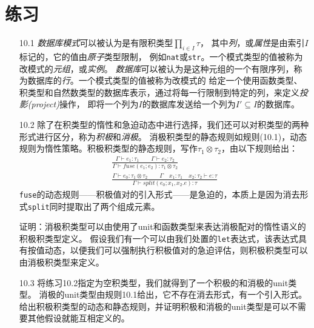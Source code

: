 \section*{练习}
\begin{itemize}
\item[10.1] \textit{数据库模式}可以被认为是有限积类型$\prod_{i\in I}\tau$，
其中\textit{列}，或\textit{属性}是由索引$I$标记的，它的值由\textit{原子}类型限制，
例如\texttt{nat}或\texttt{str}。一个模式类型的值被称为改模式的\textit{元组}，或\textit{实例}。
\textit{数据库}可以被认为是这种元组的一个有限序列，称为数据库的\textit{行}。一个模式类型的值被称为改模式的
给定一个使用函数类型、积类型和自然数类型的数据库表示，通过将每一行限制到特定的列，来定义\textit{投影(project)}操作，
即将一个列为$I$的数据库发送给一个列为$I'\subseteq I$的数据库。

\item[10.2] 除了在积类型的惰性和急迫动态中进行选择，我们还可以对积类型的两种形式进行区分，称为\textit{积极}和\textit{消极}。
消极积类型的静态规则如规则(10.1)，动态规则为惰性策略。积极积类型的静态规则，写作$\tau_1 \otimes \tau_2$，由以下规则给出：
\begin{subequations}
    \begin{gather}
    \frac{\Gamma \vdash e_1 : \tau_1 \qquad \Gamma \vdash e_2 : \tau_2}
    {\Gamma \vdash fuse(e_1;e_2):\tau_1 \otimes \tau_2} \\
    \frac{\Gamma \vdash e_0:\tau_1\otimes\tau_2\qquad\Gamma\quad x_1:\tau_1\quad x_2:\tau_2\vdash e:\tau}
    {\Gamma\vdash split(e_0;x_1,x_2 .e):\tau}
    \end{gather}
\end{subequations}
\texttt{fuse}的动态规则——积极值对的引入形式——是急迫的，本质上是因为消去形式\texttt{split}同时提取出了两个组成元素。

证明：消极积类型可以由使用了unit和函数类型来表达消极配对的惰性语义的积极积类型定义。
假设我们有一个可以由我们处置的\texttt{let}表达式，该表达式具有按值动态，以便我们可以强制执行积极值对的急迫评估，则积极积类型可以由消极积类型来定义。

\item[10.3] 将练习10.2指定为空积类型，我们就得到了一个积极的和消极的unit类型。
消极的unit类型由规则10.1给出，它不存在消去形式，有一个引入形式。
给出积极积类型的动态和静态规则，并证明积极和消极的unit类型是可以不需要其他假设就能互相定义的。
\end{itemize}

